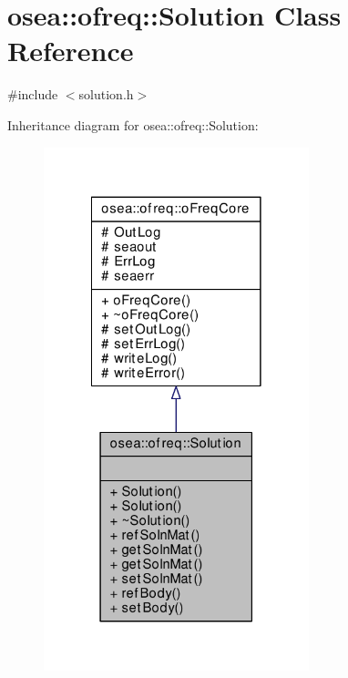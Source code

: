 \hypertarget{classosea_1_1ofreq_1_1_solution}{\section{osea\-:\-:ofreq\-:\-:Solution Class Reference}
\label{classosea_1_1ofreq_1_1_solution}
}


{\ttfamily \#include $<$solution.\-h$>$}



Inheritance diagram for osea\-:\-:ofreq\-:\-:Solution\-:
\nopagebreak
\begin{figure}[H]
\begin{center}
\leavevmode
\includegraphics[width=218pt]{classosea_1_1ofreq_1_1_solution__inherit__graph}
\end{center}
\end{figure}
